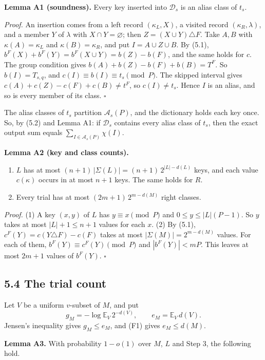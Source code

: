 \documentclass[10pt,a4paper]{article}
\begin{document}
\textbf{Lemma A1 (soundness).} Every key inserted into $\mathcal D_s$ is an alias class of $t_s$.

\emph{Proof.} An insertion comes from a left record $(\kappa_L, X)$, a visited record $(\kappa_R, \lambda)$, and a member $Y$ of
$\lambda$ with $X \cap Y = \varnothing$; then $Z = (X\cup Y)\triangle F$. Take $A, B$ with $\kappa(A) = \kappa_L$ and
$\kappa(B) = \kappa_R$, and put $I = A\cup Z\cup B$. By (5.1), $b^F(X) + b^F(Y) = b^F(X\cup Y) = b(Z) - b(F)$, and the same
holds for $c$. The group condition gives $b(A) + b(Z) - b(F) + b(B) = T^F$. So $b(I) = T_{s,q}$, and
$c(I) \equiv b(I) \equiv t_s \pmod P$. The skipped interval gives $c(A) + c(Z) - c(F) + c(B) \ne t^F$, so $c(I) \ne t_s$.
Hence $I$ is an alias, and so is every member of its class. $\square$

The alias classes of $t_s$ partition $\mathcal A_s(P)$, and the dictionary holds each key once. So, by (5.2) and
Lemma A1: if $\mathcal D_s$ contains every alias class of $t_s$, then the exact output sum equals
$\sum_{I\in\mathcal A_s(P)}\chi(I)$.

\textbf{Lemma A2 (key and class counts).}

\begin{enumerate}
\item $L$ has at most $(n+1)\,|\Sigma(L)| = (n+1)\,2^{|L| - d(L)}$ keys, and each value $c(\kappa)$ occurs in at most $n+1$
keys. The same holds for $R$.
\item Every trial has at most $(2m+1)\,2^{m - d(M)}$ right classes.
\end{enumerate}

\emph{Proof.} (1) A key $(x, y)$ of $L$ has $y \equiv x \pmod P$ and $0 \le y \le |L|(P-1)$. So $y$ takes at most
$|L| + 1 \le n + 1$ values for each $x$. (2) By (5.1), $c^F(Y) = c(Y\triangle F) - c(F)$ takes at most
$|\Sigma(M)| = 2^{m - d(M)}$ values. For each of them, $b^F(Y) \equiv c^F(Y) \pmod P$ and $|b^F(Y)| < mP$. This leaves at
most $2m+1$ values of $b^F(Y)$. $\square$

\subsection*{5.4 The trial count}

Let $V$ be a uniform $v$-subset of $M$, and put
\[g_M = -\log\mathbb E_V\, 2^{-d(V)},\qquad e_M = \mathbb E_V\, d(V).\]
Jensen's inequality gives $g_M \le e_M$, and (F1) gives $e_M \le d(M)$.

\textbf{Lemma A3.} With probability $1 - o(1)$ over $M$, $L$ and Step 3, the following hold.
\end{document}

